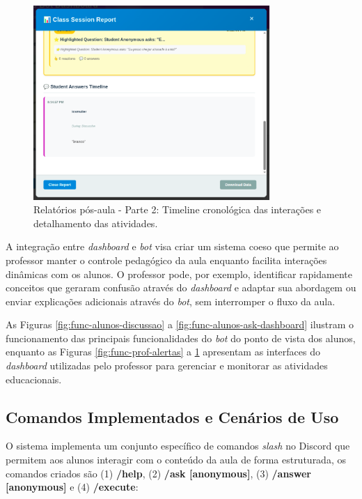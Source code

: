 \begin{figure}[H]
\centering
\includegraphics[width=0.8\textwidth]{func-professores/relatorios-parte2.png}
\caption{Relatórios pós-aula - Parte 2: Timeline cronológica das interações e detalhamento das atividades.}
\label{fig:func-prof-relatorios-2}
\end{figure}

A integração entre \textit{dashboard} e \textit{bot} visa criar um sistema coeso
que permite ao professor manter o controle pedagógico da aula enquanto facilita
interações dinâmicas com os alunos. O professor pode, por exemplo, identificar
rapidamente conceitos que geraram confusão através do \textit{dashboard} e
adaptar sua abordagem ou enviar explicações adicionais através do \textit{bot},
sem interromper o fluxo da aula.

As Figuras \ref{fig:func-alunos-discussao} a \ref{fig:func-alunos-ask-dashboard} 
ilustram o funcionamento das principais funcionalidades do \textit{bot} do ponto 
de vista dos alunos, enquanto as Figuras \ref{fig:func-prof-alertas} a 
\ref{fig:func-prof-relatorios-2} apresentam as interfaces do \textit{dashboard} 
utilizadas pelo professor para gerenciar e monitorar as atividades educacionais.

\subsection{Comandos Implementados e Cenários de Uso}
\label{subsec:comandos-implementados}

O sistema implementa um conjunto específico de comandos \textit{slash} no
Discord que permitem aos alunos interagir com o conteúdo da aula de forma
estruturada, os comandos criados são (1) \textbf{/help}, (2) \textbf{/ask
[anonymous]}, (3) \textbf{/answer [anonymous]} e (4) \textbf{/execute}:

